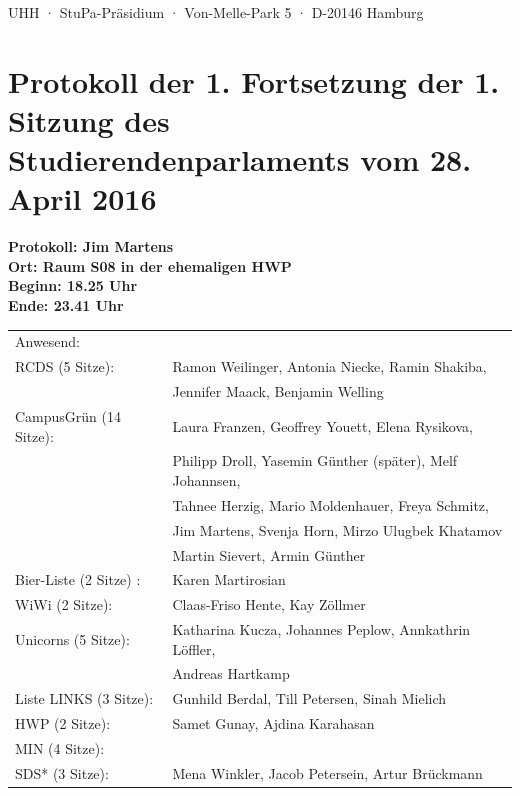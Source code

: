 \documentclass[ngerman,headheight=70pt]{scrartcl}
\begin{document}
    UHH · StuPa-Präsidium · Von-Melle-Park 5 · D-20146 Hamburg

    \section*{Protokoll der 1. Fortsetzung der 1. Sitzung des Studierendenparlaments vom 28. April 2016}

    \textbf{Protokoll: Jim Martens}\\
    \textbf{Ort: Raum S08 in der ehemaligen HWP }\\
    \textbf{Beginn: 18.25 Uhr}\\
    \textbf{Ende: 23.41 Uhr}

    \vspace{0.5cm}
    \begin{tabular}{ll}
        Anwesend: & \\
            RCDS (5 Sitze): & Ramon Weilinger, Antonia Niecke, Ramin Shakiba, \\
                            & Jennifer Maack, Benjamin Welling \\
             CampusGrün (14 Sitze): & Laura Franzen, Geoffrey Youett, Elena Rysikova, \\
                                   & Philipp Droll, Yasemin Günther (später), Melf Johannsen,\\
                                   & Tahnee Herzig, Mario Moldenhauer, Freya Schmitz, \\
                                   & Jim Martens, Svenja Horn, Mirzo Ulugbek Khatamov \\
                                   & Martin Sievert, Armin Günther \\
             Bier-Liste (2 Sitze) : & Karen Martirosian \\
             WiWi (2 Sitze): & Claas-Friso Hente, Kay Zöllmer \\
             Unicorns (5 Sitze): & Katharina Kucza, Johannes Peplow, Annkathrin Löffler, \\
                                 & Andreas Hartkamp \\
             Liste LINKS (3 Sitze): & Gunhild Berdal, Till Petersen, Sinah Mielich \\
             HWP (2 Sitze): & Samet Gunay, Ajdina Karahasan \\
             MIN (4 Sitze): &  \\
             SDS* (3 Sitze): & Mena Winkler, Jacob Petersein, Artur Brückmann \\

\end{tabular}
\end{document}
